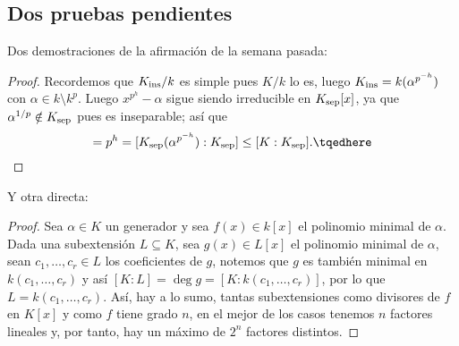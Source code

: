 \documentclass[11pt, reqno]{amsart}
\begin{document}
\begin{additional}
\section{Dos pruebas pendientes}
Dos demostraciones de la afirmación de la semana pasada:
\begin{proof}
	Recordemos que $K_{\rm ins}/k$ es simple pues $K/k$ lo es, luego $K_{\rm ins} = k(\alpha^{p^{-h}})$ con $\alpha \in k \setminus k^p$.
	Luego $x^{p^h} - \alpha$ sigue siendo irreducible en $K_{\rm sep}[x]$, ya que $\alpha^{1/p} \notin K_{\rm sep}$ pues es inseparable;
	así que
	\begin{equation}
		[K_{\rm ins} : k] = p^h = [K_{\rm sep}(\alpha^{p^{-h}}) : K_{\rm sep}] \le [K : K_{\rm sep}].
		\tqedhere
	\end{equation}
\end{proof}
Y otra directa:
\begin{proof}
	Sea $\alpha \in K$ un generador y sea $f(x) \in k[x]$ el polinomio minimal de $\alpha$.
	Dada una subextensión $L \subseteq K$, sea $g(x) \in L[x]$ el polinomio minimal de $\alpha$, sean $c_1, \dots, c_r \in L$ los
	coeficientes de $g$, notemos que $g$ es también minimal en $k(c_1, \dots, c_r)$ y así $[K : L] = \deg g = [K : k(c_1, \dots, c_r)]$,
	por lo que $L = k(c_1, \dots, c_r)$.
	Así, hay a lo sumo, tantas subextensiones como divisores de $f$ en $K[x]$ y como $f$ tiene grado $n$, en el mejor de los casos
	tenemos $n$ factores lineales y, por tanto, hay un máximo de $2^n$ factores distintos.
\end{proof}
\end{additional}

\printbibliography
\end{document}
